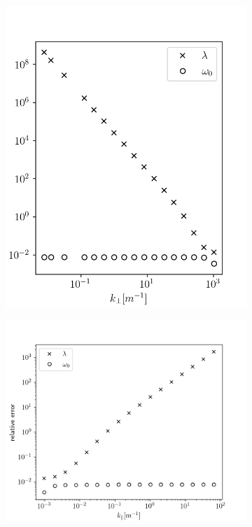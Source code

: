 \begin{figure}[H]
	\centering
	\begin{subfigure}[b]{0.45\textwidth}
		\centering
		\includegraphics[width=.98\textwidth]{schemes/groundedSLABunderdampedFiterrors_k_para_fixed.png}
		\label{fig:electromagneticSLAB_errorGrounded_kPara_fixed}
	\end{subfigure}
	\begin{subfigure}[b]{0.45\textwidth}
		\centering
		\includegraphics[width=1\textwidth]{schemes/groundedSLABunderdampedFiterrors_k_perp_fixed.png}

\end{subfigure}
\end{figure}
